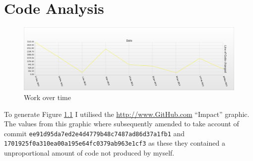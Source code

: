 \chapter{Code Analysis}

\begin{figure}[htb]
  \centering
  \includegraphics[width=\textwidth, keepaspectratio=true]{images/git_work_time.png}
  \caption{Work over time}
  \label{fig:git_work_time}
\end{figure}

To generate Figure \ref{fig:git_work_time} I utilised the \url{http://www.GitHub.com} ``Impact'' graphic.
The values from this graphic where subsequently amended to take account of commit
\texttt{ee91d95da7ed2e4d4779b48c7487ad86d37a1fb1} and
\texttt{1701925f0a310ea00a195e64fc0379ab963e1cf3} as these they contained a unproportional
amount of code not produced by myself.

%
%
%
%
%
%
